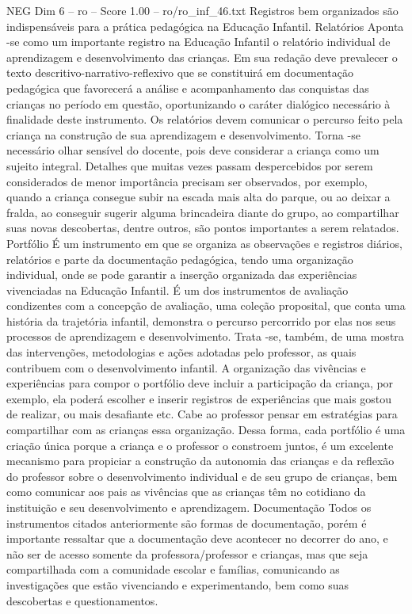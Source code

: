 \begin{textsample}{NEG Dim 6 – ro – Score 1.00 – ro/ro\_inf\_46.txt}
Registros bem organizados são indispensáveis para a prática pedagógica na Educação Infantil.
Relatórios Aponta -se como um importante registro na Educação Infantil o relatório individual de aprendizagem e desenvolvimento das crianças.
Em sua redação deve prevalecer o texto descritivo-narrativo-reflexivo que se constituirá em documentação pedagógica que favorecerá a análise e acompanhamento das conquistas das crianças no período em questão, oportunizando o caráter dialógico necessário à finalidade deste instrumento.
Os relatórios devem comunicar o percurso feito pela criança na construção de sua aprendizagem e desenvolvimento.
Torna -se necessário olhar sensível do docente, pois deve considerar a criança como um sujeito integral.
Detalhes que muitas vezes passam despercebidos por serem considerados de menor importância precisam ser observados, por exemplo, quando a criança consegue subir na escada mais alta do parque, ou ao deixar a fralda, ao conseguir sugerir alguma brincadeira diante do grupo, ao compartilhar suas novas descobertas, dentre outros, são pontos importantes a serem relatados.
Portfólio É um instrumento em que se organiza as observações e registros diários, relatórios e parte da documentação pedagógica, tendo uma organização individual, onde se pode garantir a inserção organizada das experiências vivenciadas na Educação Infantil.
É um dos instrumentos de avaliação condizentes com a concepção de avaliação, uma coleção proposital, que conta uma história da trajetória infantil, demonstra o percurso percorrido por elas nos seus processos de aprendizagem e desenvolvimento.
Trata -se, também, de uma mostra das intervenções, metodologias e ações adotadas pelo professor, as quais contribuem com o desenvolvimento infantil.
A organização das vivências e experiências para compor o portfólio deve incluir a participação da criança, por exemplo, ela poderá escolher e inserir registros de experiências que mais gostou de realizar, ou mais desafiante etc.
Cabe ao professor pensar em estratégias para compartilhar com as crianças essa organização.
Dessa forma, cada portfólio é uma criação única porque a criança e o professor o constroem juntos, é um excelente mecanismo para propiciar a construção da autonomia das crianças e da reflexão do professor sobre o desenvolvimento individual e de seu grupo de crianças, bem como comunicar aos pais as vivências que as crianças têm no cotidiano da instituição e seu desenvolvimento e aprendizagem.
Documentação Todos os instrumentos citados anteriormente são formas de documentação, porém é importante ressaltar que a documentação deve acontecer no decorrer do ano, e não ser de acesso somente da professora/professor e crianças, mas que seja compartilhada com a comunidade escolar e famílias, comunicando as investigações que estão vivenciando e experimentando, bem como suas descobertas e questionamentos.

\end{textsample}
